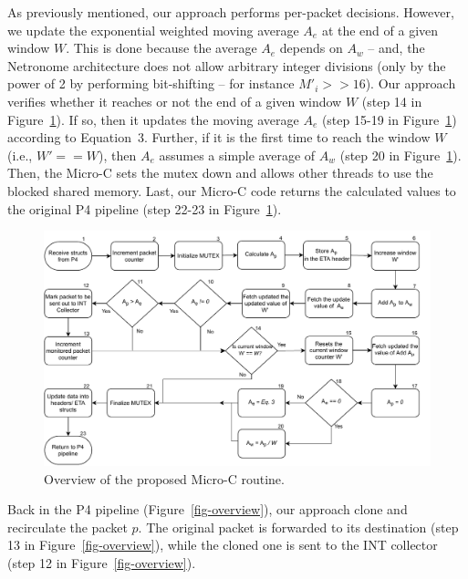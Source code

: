 As previously mentioned, our approach performs per-packet decisions. However, we update the exponential weighted moving average $A_e$ at the end of a given window $W$. This is done because the average $A_e$ depends on $A_w$ -- and, the Netronome architecture does not allow arbitrary integer divisions (only by the power of 2 by performing bit-shifting -- for instance $M'_i >> 16$). Our approach verifies whether it reaches or not the end of a given window $W$ (step 14 in Figure~\ref{fig-overview-microc}). If so, then it updates the moving average $A_e$ (step 15-19 in Figure~\ref{fig-overview-microc}) according to Equation~3. Further, if it is the first time to reach the window $W$ (i.e., $W' == W$), then $A_e$ assumes a simple average of $A_w$ (step 20 in Figure~\ref{fig-overview-microc}). Then, the Micro-C sets the mutex down and allows other threads to use the blocked shared memory. Last, our Micro-C code returns the calculated values to the original P4 pipeline (step 22-23 in Figure~\ref{fig-overview-microc}). 

\begin{figure}[t]
\centering
        \includegraphics[scale=0.38]{aina-img/apf_micro_c.pdf}
        \caption{Overview of the proposed Micro-C routine.}
        \label{fig-overview-microc}
\end{figure}

Back in the P4 pipeline (Figure~\ref{fig-overview}), our approach clone and recirculate the packet $p$. The original packet is forwarded to its destination (step 13 in Figure~\ref{fig-overview}), while the cloned one is sent to the INT collector (step 12 in Figure~\ref{fig-overview}).


